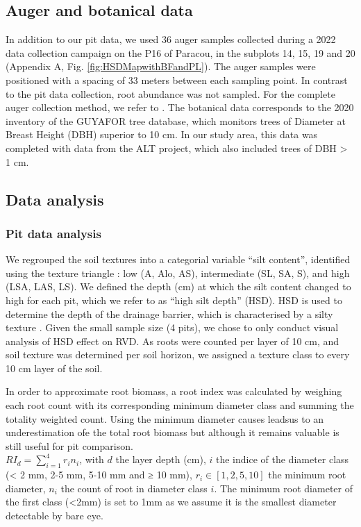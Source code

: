 \documentclass[fleqn,12pt]{latex/stylish_article} %
\begin{document}
\hypertarget{auger-and-botanical-data}{%
\subsection{Auger and botanical data}\label{auger-and-botanical-data}}

In addition to our pit data, we used 36 auger samples collected during a 2022 data collection campaign on the P16 of Paracou, in the subplots 14, 15, 19 and 20 (Appendix A, Fig. \ref{fig:HSDMapwithBFandPL}). The auger samples were positioned with a spacing of 33 meters between each sampling point. In contrast to the pit data collection, root abundance was not sampled. For the complete auger collection method, we refer to \citet{dognypietteAbioticFactorsRelated}.
The botanical data corresponds to the 2020 inventory of the GUYAFOR tree database, which monitors trees of Diameter at Breast Height (DBH) superior to 10 cm. In our study area, this data was completed with data from the ALT project, which also included trees of DBH \textgreater{} 1 cm.

\hypertarget{data-analysis}{%
\subsection{Data analysis}\label{data-analysis}}

\hypertarget{pit-data-analysis}{%
\subsubsection{Pit data analysis}\label{pit-data-analysis}}

We regrouped the soil textures into a categorial variable \enquote{silt content}, identified using the texture triangle \citep{jamagneSoilMappingVital1977}: low (A, Alo, AS), intermediate (SL, SA, S), and high (LSA, LAS, LS). We defined the depth (cm) at which the silt content changed to high for each pit, which we refer to as \enquote{high silt depth} (HSD). HSD is used to determine the depth of the drainage barrier, which is characterised by a silty texture \citep{ferryGeneseFonctionnementHydrique2003, humbelCaracterisationParMesures1978}. Given the small sample size (4 pits), we chose to only conduct visual analysis of HSD effect on RVD. As roots were counted per layer of 10 cm, and soil texture was determined per soil horizon, we assigned a texture class to every 10 cm layer of the soil.

In order to approximate root biomass, a root index was calculated by weighing each root count with its corresponding minimum diameter class and summing the totality weighted count. Using the minimum diameter causes leadsus to an underestimation ofe the total root biomass but although it remains valuable is still useful for pit comparison.\\
\(RI_d = \sum_{i=1}^4 r_i n_i\), with \(d\) the layer depth (cm), \(i\) the indice of the diameter class (\textless{} 2 mm, 2-5 mm, 5-10 mm and ≥ 10 mm), \(r_i \in [1, 2, 5, 10]\) the minimum root diameter, \(n_i\) the count of root in diameter class \(i\). The minimum root diameter of the first class (\textless2mm) is set to 1mm as we assume it is the smallest diameter detectable by bare eye.
\end{document}
